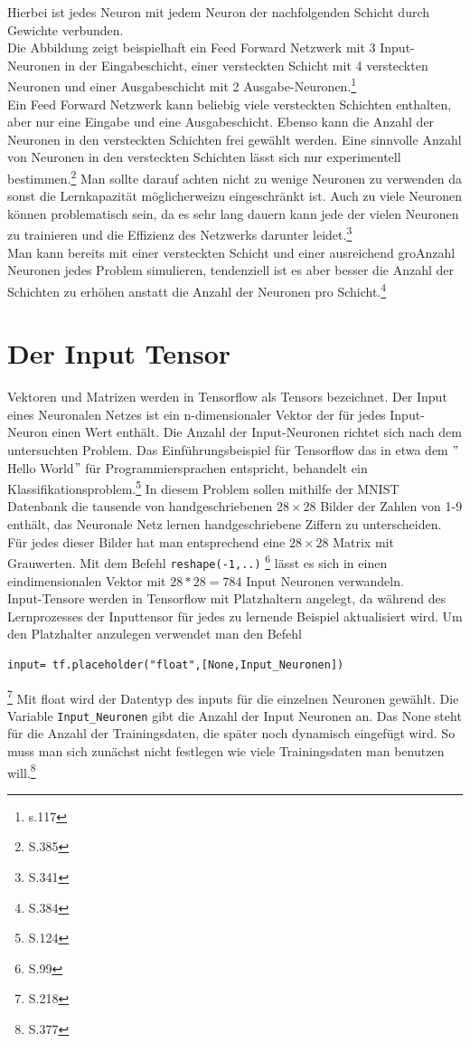 Hierbei ist jedes Neuron mit jedem Neuron der nachfolgenden Schicht durch Gewichte verbunden.\\
Die Abbildung zeigt beispielhaft ein Feed Forward Netzwerk mit 3 Input-Neuronen in der Eingabeschicht, einer versteckten Schicht mit 4 versteckten Neuronen und einer Ausgabeschicht mit 2 Ausgabe-Neuronen.\footnote{\cite{Bishop1995}s.117}\\
Ein Feed Forward Netzwerk kann beliebig viele versteckten Schichten enthalten, aber nur eine Eingabe und eine Ausgabeschicht. Ebenso kann die Anzahl der Neuronen in den versteckten Schichten frei gew\"ahlt werden. Eine sinnvolle Anzahl von Neuronen in den versteckten Schichten l\"asst sich nur experimentell bestimmen.\footnote{\cite{handson} S.385} Man sollte darauf achten nicht zu wenige Neuronen zu verwenden da sonst die Lernkapazit\"at m\"oglicherwei\sse zu eingeschr\"ankt ist. Auch zu viele Neuronen k\"onnen problematisch sein, da es sehr lang dauern kann jede der vielen Neuronen zu trainieren und die Effizienz des Netzwerks darunter leidet.\footnote{\cite{Rashid} S.341}\\ Man kann bereits mit einer versteckten Schicht und einer ausreichend gro\ssen Anzahl Neuronen jedes Problem simulieren, tendenziell ist es aber besser die Anzahl der Schichten zu erh\"ohen anstatt die Anzahl der Neuronen pro Schicht.\footnote{\cite{handson} S.384}
\section{Der Input Tensor}
Vektoren und Matrizen werden in Tensorflow als Tensors bezeichnet. Der Input eines Neuronalen Netzes ist ein n-dimensionaler Vektor der f\"ur jedes Input-Neuron einen Wert enth\"alt. Die Anzahl der Input-Neuronen richtet sich nach dem untersuchten Problem. Das Einf\"uhrungsbeispiel f\"ur Tensorflow das in etwa dem $"$Hello World$"$ f\"ur Programmiersprachen entspricht, behandelt ein Klassifikationsproblem.\footnote{\cite{handson} S.124} In diesem Problem sollen mithilfe der MNIST Datenbank die tausende von handgeschriebenen $28 \times 28$ Bilder der Zahlen von 1-9 enth\"alt, das Neuronale Netz lernen handgeschriebene Ziffern zu unterscheiden. F\"ur jedes dieser Bilder hat man entsprechend eine $28 \times 28$ Matrix mit Grauwerten. Mit dem Befehl \lstinline$reshape(-1,..)$ \footnote{\cite{handson} S.99} l\"asst es sich in einen eindimensionalen Vektor mit  $28*28=784$ Input Neuronen verwandeln.\\
Input-Tensore werden in Tensorflow mit Platzhaltern angelegt, da w\"ahrend des Lernprozesses der Inputtensor f\"ur jedes zu lernende Beispiel aktualisiert wird. Um den Platzhalter anzulegen verwendet man den Befehl\begin{lstlisting}
input= tf.placeholder("float",[None,Input_Neuronen])
\end{lstlisting}\footnote{\cite{cookbook} S.218} 
Mit float wird der Datentyp des inputs f\"ur die einzelnen Neuronen gew\"ahlt. Die Variable \lstinline$Input_Neuronen$ gibt die Anzahl der Input Neuronen an. Das None steht f\"ur die Anzahl der Trainingsdaten, die sp\"ater noch dynamisch eingef\"ugt wird. So muss man sich zun\"achst nicht festlegen wie viele Trainingsdaten man benutzen will.\footnote{\cite{handson} S.377}

